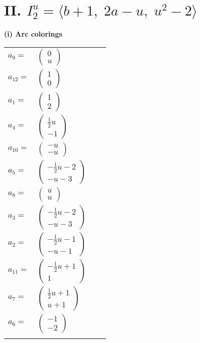 \documentclass[1p]{elsarticle_modified}
\theoremstyle{definition}
\begin{document}
\centering \section*{II. $I^u_{2}= \langle b+1,\;2 a- u,\;u^2-2 \rangle$}
\flushleft \textbf{(i) Arc colorings}\\
\begin{tabular}{m{7pt} m{180pt} m{7pt} m{180pt} }
\flushright $a_{9}=$&$\begin{pmatrix}0\\u\end{pmatrix}$ \\
\flushright $a_{12}=$&$\begin{pmatrix}1\\0\end{pmatrix}$ \\
\flushright $a_{1}=$&$\begin{pmatrix}1\\2\end{pmatrix}$ \\
\flushright $a_{4}=$&$\begin{pmatrix}\frac{1}{2} u\\-1\end{pmatrix}$ \\
\flushright $a_{10}=$&$\begin{pmatrix}- u\\- u\end{pmatrix}$ \\
\flushright $a_{5}=$&$\begin{pmatrix}-\frac{1}{2} u-2\\- u-3\end{pmatrix}$ \\
\flushright $a_{8}=$&$\begin{pmatrix}u\\u\end{pmatrix}$ \\
\flushright $a_{3}=$&$\begin{pmatrix}-\frac{1}{2} u-2\\- u-3\end{pmatrix}$ \\
\flushright $a_{2}=$&$\begin{pmatrix}-\frac{1}{2} u-1\\- u-1\end{pmatrix}$ \\
\flushright $a_{11}=$&$\begin{pmatrix}-\frac{1}{2} u+1\\1\end{pmatrix}$ \\
\flushright $a_{7}=$&$\begin{pmatrix}\frac{1}{2} u+1\\u+1\end{pmatrix}$ \\
\flushright $a_{6}=$&$\begin{pmatrix}-1\\-2\end{pmatrix}$\\&\end{tabular}
\end{document}
